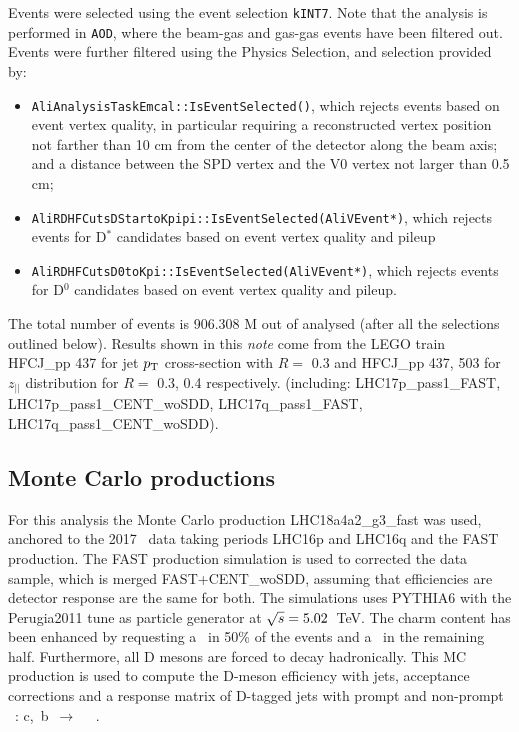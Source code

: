 Events were selected using the event selection \texttt{kINT7}. Note that the analysis is performed in \texttt{AOD}, where the beam-gas and gas-gas events have been filtered out.
Events were further filtered using the Physics Selection, and selection provided by:
\begin{itemize}
\item \texttt{AliAnalysisTaskEmcal::IsEventSelected()}, which rejects events based on event vertex quality, in particular requiring a reconstructed vertex position not farther than 10 cm from the center of the detector along the beam axis; and a distance between the SPD vertex and the V0 vertex not larger than 0.5 cm;
\item \texttt{AliRDHFCutsDStartoKpipi::IsEventSelected(AliVEvent*)}, which rejects events for D$^*$ candidates based on event vertex quality and pileup
\item \texttt{AliRDHFCutsD0toKpi::IsEventSelected(AliVEvent*)}, which rejects events for D$^0$ candidates based on event vertex quality and pileup.
\end{itemize}

The total number of events is 906.308  M  out of  analysed (after all the selections outlined below).
Results shown in this {\it note} come from the LEGO train HFCJ\_pp 437 %
for jet $p_{\text T}$ cross-section with $R=$ 0.3 and HFCJ\_pp 437, 503 %
for $z_{||}$ distribution for $R=$ 0.3, 0.4 %
respectively.
 (including: LHC17p\_pass1\_FAST, LHC17p\_pass1\_CENT\_woSDD, LHC17q\_pass1\_FAST, LHC17q\_pass1\_CENT\_woSDD).

\subsection{Monte Carlo productions}

For this analysis the Monte Carlo production LHC18a4a2\_g3\_fast was used, anchored to the 2017 \pp\ data taking periods LHC16p and LHC16q and the FAST production. The FAST production simulation is used to corrected the data sample, which is merged FAST+CENT\_woSDD, assuming that efficiencies are detector response are the same for both.
The simulations uses PYTHIA6 with the Perugia2011 tune as particle generator at $\sqrt{s}=5.02$~TeV.
The charm content has been enhanced by requesting a \ccbar\ in 50\% of the events and a \bbbar\ in the remaining half.
Furthermore, all D mesons are forced to decay hadronically.
This MC production is used to compute the D-meson efficiency with jets, acceptance corrections and a response matrix of D-tagged jets with prompt and non-prompt \Dzero\ : c,~b~$\rightarrow$ ~\Dzero\ .


